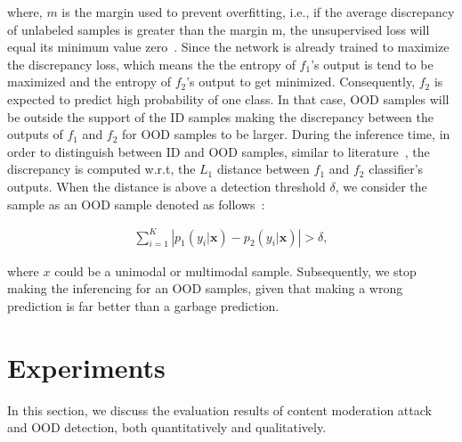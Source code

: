 \hspace*{3.5mm} where, $m$ is the margin used to prevent overfitting, i.e., if the average discrepancy of unlabeled samples is greater than the margin m, the unsupervised loss will equal its minimum value zero~\cite{yu2019unsupervised}. Since the network is already trained to maximize the discrepancy loss, which means the the entropy of $f_1$’s output is tend to be maximized and the entropy of $f_2$’s output to get minimized. Consequently, $f_2$ is expected to predict high probability of one class. In that case, OOD samples will be outside the support of the ID samples making the discrepancy between the outputs of $f_{1}$ and $f_{2}$ for OOD samples to be larger. During the inference time, in order to distinguish between ID and OOD samples, similar to literature~\cite{yu2019unsupervised}, the discrepancy is computed w.r.t, the $L_1$ distance between $f_{1}$ and $f_{2}$ classifier's outputs. When the distance is above a detection threshold $\delta$, we consider the sample as an OOD sample denoted as follows~\cite{yu2019unsupervised}: 

\vspace{-6mm}
\begin{align}
    \sum_{i=1}^{K}\left|p_{1}\left(y_{i} | \mathbf{x}\right)-p_{2}\left(y_{i} | \mathbf{x}\right)\right|>\delta, 
\end{align}

\hspace*{3.5mm} where $x$ could be a unimodal or multimodal sample. Subsequently, we stop making the inferencing for an OOD samples, given that making a wrong prediction is far better than a garbage prediction. 
\section{Experiments}\label{chapter_6:results} 
In this section, we discuss the evaluation results of content moderation attack and OOD detection, both quantitatively and qualitatively. %

